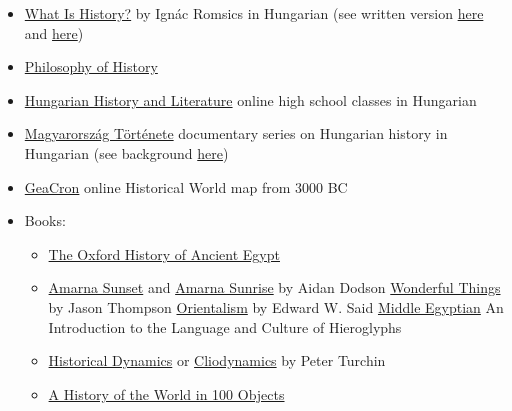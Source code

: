 \documentclass{article}
\begin{document}
\begin{itemize}
    \item \href{https://mindentudas.videotorium.hu/hu/recordings/8176/mi-a-tortenelem}{What Is History?} by Ignác Romsics in Hungarian (see written version \href{http://real-eod.mtak.hu/1022/1/04\%20Romsics\%20Ign\%C3\%A1c.pdf}{here} and \href{https://mindentudas.hu/el\%C5\%91ad\%C3\%A1sok/tudom\%C3\%A1nyter\%C3\%BCletek/b\%C3\%B6lcs\%C3\%A9szettudom\%C3\%A1ny/138-t\%C3\%B6rt\%C3\%A9nelemtudom\%C3\%A1nyok/6059-a-toertenetiro-dilemmaja-megismerjuek-vagy-csinaljuk-e-a-toertenelmet.html}{here})
    \item \href{https://www.britannica.com/topic/philosophy-of-history}{Philosophy of History}
    \item \href{https://www.youtube.com/channel/UCMFOiJn5wGreCszxZ9xuyTg/playlists}{Hungarian History and Literature} online high school classes in Hungarian
    \item \href{https://nava.hu/id/798970/}{Magyarország Története} documentary series on Hungarian history in Hungarian (see background \href{https://hu.wikipedia.org/wiki/Magyarorsz\%C3\%A1g_t\%C3\%B6rt\%C3\%A9nete_(telev\%C3\%ADzi\%C3\%B3s_sorozat)}{here})
    \item \href{http://geacron.com/home-en/}{GeaCron} online Historical World map from 3000 BC
    \item Books:
    \begin{itemize}
        \item \href{https://www.goodreads.com/book/show/139310.The_Oxford_History_of_Ancient_Egypt}{The Oxford History of Ancient Egypt}
        \item \href{https://www.goodreads.com/book/show/6476537-amarna-sunset}{Amarna Sunset} and \href{https://www.goodreads.com/book/show/18798554-amarna-sunrise}{Amarna Sunrise} by Aidan Dodson
        \href{https://aucpress.com/product/wonderful-things/}{Wonderful Things} by Jason Thompson
        \href{https://www.goodreads.com/en/book/show/355190.Orientalism}{Orientalism} by Edward W. Said
        \href{https://www.cambridge.org/core/books/middle-egyptian/831CD0936A9DC45988F94B74C598353E}{Middle Egyptian} An Introduction to the Language and Culture of Hieroglyphs
        
        \item \href{https://www.goodreads.com/en/book/show/480002.Historical_Dynamics}{Historical Dynamics} or \href{https://www.nature.com/articles/488024a}{Cliodynamics} by Peter Turchin

        \item \href{https://www.goodreads.com/en/book/show/9553383}{A History of the World in 100 Objects}


\end{itemize}
\end{itemize}
\end{document}
